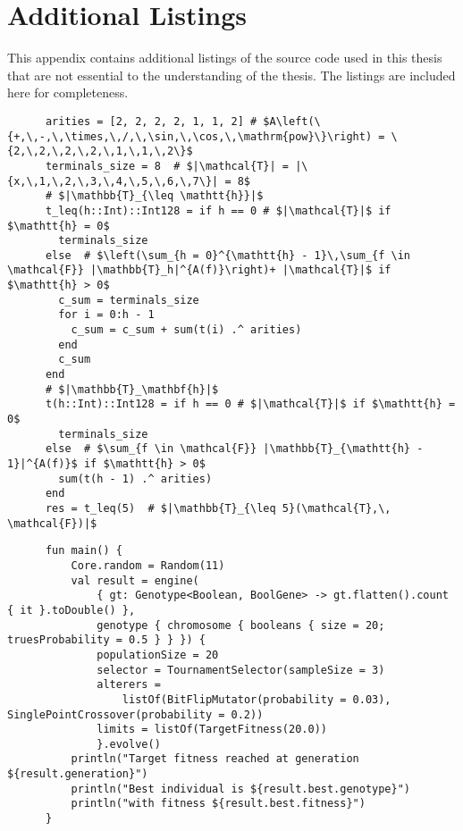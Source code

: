 \chapter{Additional Listings}
\label{app:Listings}
  This appendix contains additional listings of the source code used in this
  thesis that are not essential to the understanding of the thesis.
  The listings are included here for completeness.
  
  \begin{src}
    \label{lst:cardinality_of_T_leq_5}
    \begin{verbatim}
      arities = [2, 2, 2, 2, 1, 1, 2] # $A\left(\{+,\,-,\,\times,\,/,\,\sin,\,\cos,\,\mathrm{pow}\}\right) = \{2,\,2,\,2,\,2,\,1,\,1,\,2\}$
      terminals_size = 8  # $|\mathcal{T}| = |\{x,\,1,\,2,\,3,\,4,\,5,\,6,\,7\}| = 8$
      # $|\mathbb{T}_{\leq \mathtt{h}}|$
      t_leq(h::Int)::Int128 = if h == 0 # $|\mathcal{T}|$ if $\mathtt{h} = 0$
        terminals_size
      else  # $\left(\sum_{h = 0}^{\mathtt{h} - 1}\,\sum_{f \in \mathcal{F}} |\mathbb{T}_h|^{A(f)}\right)+ |\mathcal{T}|$ if $\mathtt{h} > 0$
        c_sum = terminals_size
        for i = 0:h - 1
          c_sum = c_sum + sum(t(i) .^ arities)
        end
        c_sum
      end
      # $|\mathbb{T}_\mathbf{h}|$
      t(h::Int)::Int128 = if h == 0 # $|\mathcal{T}|$ if $\mathtt{h} = 0$
        terminals_size
      else  # $\sum_{f \in \mathcal{F}} |\mathbb{T}_{\mathtt{h} - 1}|^{A(f)}$ if $\mathtt{h} > 0$
        sum(t(h - 1) .^ arities) 
      end
      res = t_leq(5)  # $|\mathbb{T}_{\leq 5}(\mathcal{T},\, \mathcal{F})|$
    \end{verbatim}
  \end{src}

  \begin{src}
    \label{lst:app:keen_one_max}
    \begin{verbatim}
      fun main() {
          Core.random = Random(11)
          val result = engine(
              { gt: Genotype<Boolean, BoolGene> -> gt.flatten().count { it }.toDouble() },
              genotype { chromosome { booleans { size = 20; truesProbability = 0.5 } } }) {
              populationSize = 20
              selector = TournamentSelector(sampleSize = 3)
              alterers =
                  listOf(BitFlipMutator(probability = 0.03), SinglePointCrossover(probability = 0.2))
              limits = listOf(TargetFitness(20.0))
              }.evolve()
          println("Target fitness reached at generation ${result.generation}")
          println("Best individual is ${result.best.genotype}")
          println("with fitness ${result.best.fitness}")
      }
    \end{verbatim}
  \end{src}